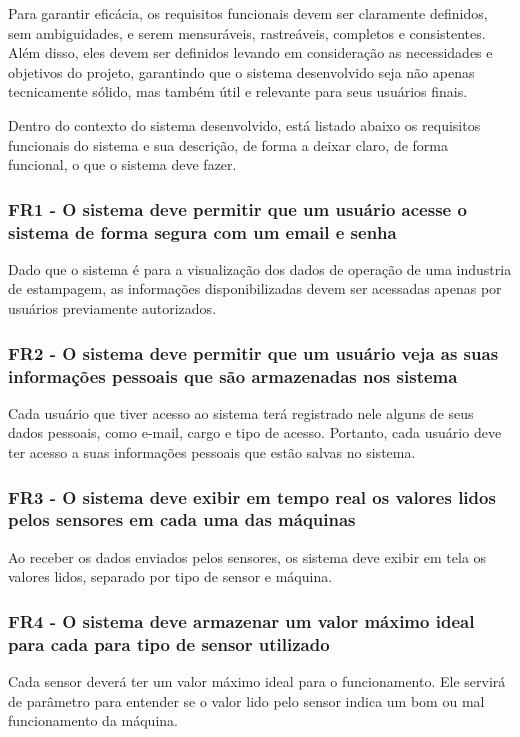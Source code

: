 Para garantir eficácia, os requisitos funcionais devem ser claramente definidos, sem ambiguidades, e serem mensuráveis, rastreáveis, completos e consistentes. Além disso, eles devem ser definidos levando em consideração as necessidades e objetivos do projeto, garantindo que o sistema desenvolvido seja não apenas tecnicamente sólido, mas também útil e relevante para seus usuários finais.

Dentro do contexto do sistema desenvolvido, está listado abaixo os requisitos funcionais do sistema e sua descrição, de forma a deixar claro, de forma funcional, o que o sistema deve fazer.

\subsubsection{FR1 - O sistema deve permitir que um usuário acesse o sistema de forma segura com um email e senha}
Dado que o sistema é para a visualização dos dados de operação de uma industria de estampagem, as informações disponibilizadas devem ser acessadas apenas por usuários previamente autorizados.

\subsubsection{FR2 - O sistema deve permitir que um usuário veja as suas informações pessoais que são armazenadas nos sistema}
Cada usuário que tiver acesso ao sistema terá registrado nele alguns de seus dados pessoais, como e-mail, cargo e tipo de acesso. Portanto, cada usuário deve ter acesso a suas informações pessoais que estão salvas no sistema.

\subsubsection{FR3 - O sistema deve exibir em tempo real os valores lidos pelos sensores em cada uma das máquinas}
Ao receber os dados enviados pelos sensores, os sistema deve exibir em tela os valores lidos, separado por tipo de sensor e máquina. 

\subsubsection{FR4 - O sistema deve armazenar um valor máximo ideal para cada para tipo de sensor utilizado}
Cada sensor deverá ter um valor máximo ideal para o funcionamento. Ele servirá de parâmetro para entender se o valor lido pelo sensor indica um bom ou mal funcionamento da máquina.

